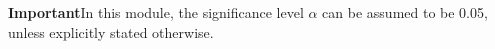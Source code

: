 \documentclass[]{report}
\begin{document}
\begin{framed}
\noindent \textbf{Important}In this module, the significance level $\alpha$ can be assumed to be 0.05, unless explicitly stated otherwise.
\end{framed}





%
%
%

%
%
%

%
%
\end{document}
